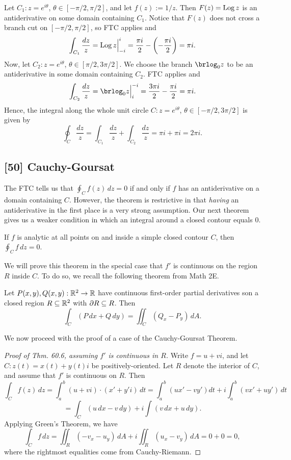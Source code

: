 \documentclass{article}
\begin{document}
\begin{example}
Let $C_1: z=e^{i\theta}$, $\theta\in [-\pi/2, \pi/2]$, and let $f(z) := 1/z$. Then $F(z) = \operatorname{Log} z$ is an antiderivative on some domain containing $C_1$. Notice that $F(z)$ does not cross a branch cut on $[-\pi/2, \pi/2]$, so FTC applies and
$$\int_{C_1} \frac{dz}z = \operatorname{Log} z\Big|_{-i}^i = \frac{\pi i}2 - \left(-\frac{\pi i}2 \right) = \pi i.$$
Now, let $C_2: z=e^{i\theta}$, $\theta\in [\pi/2, 3\pi/2]$. We choose the branch $\ds\brlog_0 z$ to be an antiderivative in some domain containing $C_2$. FTC applies and
$$\int_{C_2} \frac {dz}{z} = \brlog_0 z\Big|_i^{ -i} = \frac{3\pi i}2 - \frac{\pi i}2 = \pi i.$$
Hence, the integral along the whole unit circle $C: z=e^{i\theta}$, $\theta\in[-\pi/2, 3\pi/2]$ is given by
$$\oint_C \frac{dz}z = \int_{C_1}\frac{dz}z + \int_{C_2}\frac{dz}z = \pi i + \pi i = \boxed{2 \pi i}.$$
\end{example}
\subsection*{[50] Cauchy-Goursat}
The FTC tells us that $\oint_C f(z)\, dz = 0$ if and only if $f$ has an antiderivative on a domain containing $C$. However, the theorem is restrictive in that \textit{having} an antiderivative in the first place is a very strong assumption. Our next theorem gives us a weaker condition in which an integral around a closed contour equals $0$.
\begin{theorem}
If $f$ is analytic at all points on and inside a simple closed contour $C$, then $\oint_C f\, dz = 0$.
\end{theorem}
\newpage
We will prove this theorem in the special case that $f'$ is continuous on the region $R$ inside $C$. To do so, we recall the following theorem from Math 2E.
\begin{theorem}
Let $P(x,y), Q(x,y): \mathbb R^2\to \mathbb R$ have continuous first-order partial derivatives son a closed region $R\subseteq \mathbb R^2$ with $\partial R\subseteq R$. Then
$$\int_C (P\, dx + Q\, dy) = \iint_C (Q_x - P_y)\, dA.$$
\end{theorem}
We now proceed with the proof of a case of the Cauchy-Goursat Theorem.
\begin{proof}[Proof of Thm. 60.6, assuming $f'$ is continuous in $R$]
Write $f = u+vi$, and let $C: z(t) = x(t) + y(t)i$ be positively-oriented. Let $R$ denote the interior of $C$, and assume that $f'$ is continuous on $R$. Then
$$\int_C f(z)\, dz = \int_a^b (u+vi)\cdot (x' + y'i)\, dt = \int_a^b (ux' - vy') dt + i\int_a^b (vx' + uy')\, dt$$
$$=\int_C (u\, dx - v\, dy) + i\int (v\, dx + u\, dy).$$
Applying Green's Theorem, we have
$$\int_C f\, dz = \iint_R (-v_x - u_y)\, dA + i\iint_R (u_x - v_y)\, dA = 0+0 = 0,$$
where the rightmost equalities come from Cauchy-Riemann.
\end{proof}
\setcounter{section}{63}
\end{document}
